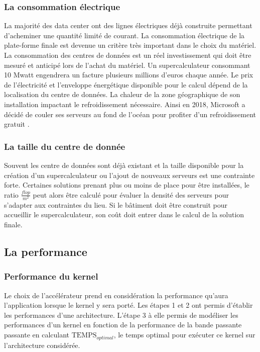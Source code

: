 \subsubsection{La consommation électrique}
La majorité des data center ont des lignes électriques déjà construite permettant d’acheminer une quantité limité de courant. La consommation électrique de la plate-forme finale est devenue un critère très important dans le choix du matériel. La consommation des centres de données est un réel investissement qui doit être mesuré et anticipé lors de l'achat du matériel. Un supercalculateur consommant 10 Mwatt engendrera un facture plusieurs millions d'euros chaque année. Le prix de l'électricité et l'enveloppe énergétique disponible pour le calcul dépend de la localisation du centre de données. La chaleur de la zone géographique de son installation impactant le refroidissement nécessaire. Ainsi en 2018, Microsoft a décidé de couler ses serveurs au fond de l'océan pour profiter d'un refroidissement gratuit \cite{ChristineHall2018}.

\subsubsection{La taille du centre de donnée} 
Souvent les centre de données sont déjà existant et la taille disponible pour la création d'un supercalculateur ou l'ajout de nouveaux serveurs est une contrainte forte. Certaines solutions prenant plus ou moins de place pour être installées, le ratio $\frac{flop}{m^2}$ peut alors être calculé pour évaluer la densité des serveurs pour s'adapter aux contraintes du lieu. Si le bâtiment doit être construit pour accueillir le supercalculateur, son coût doit entrer dans le calcul de la solution finale.




\subsection{La performance}

\subsubsection{Performance du kernel}
Le choix de l'accélérateur prend en considération la performance qu'aura l'application lorsque le kernel y sera porté. Les étapes 1 et 2 ont permis d'établir les performances d'une architecture. L'étape 3 à elle permis de modéliser les performances d'un kernel en fonction de la performance de la bande passante passante en calculant $\text{TEMPS}_{optimal}$, le temps optimal pour exécuter ce kernel sur l'architecture considérée.

